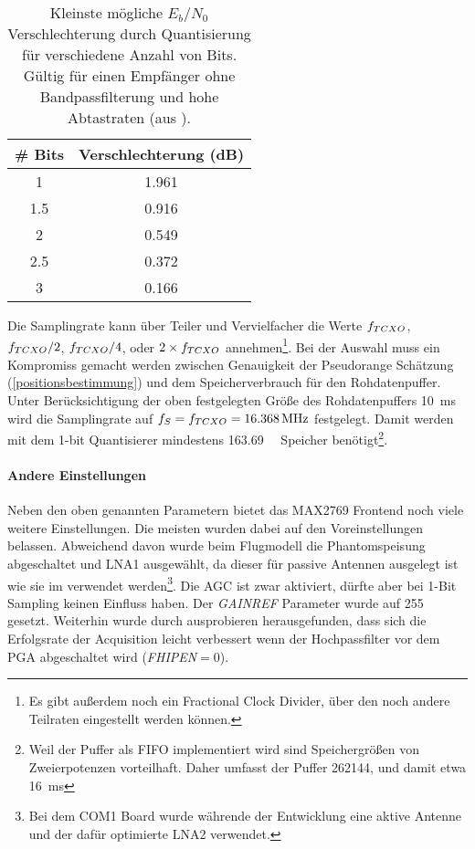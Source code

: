 \begin{table}[htbp]
    \ttabbox
    {
        \caption[$E_b/N_0$ Verschlechterung durch Quantisierung]{Kleinste mögliche $E_b/N_0$ Verschlechterung durch Quantisierung für verschiedene Anzahl von Bits. Gültig für einen Empfänger ohne Bandpassfilterung und hohe Abtastraten (aus \cite{hegarty2011analytical}).}
        \label{TabDegradQuant}
    }
    {
    \begin{tabular}{c c}
        \toprule
        \# Bits             &  Verschlechterung (dB)\\
        \midrule
        \num{1}         & \num{1,961} \\
        \num{1.5}    & \num{0.916} \\
        \num{2}           & \num{0.549} \\
        \num{2.5}    & \num{0.372} \\
        \num{3}           & \num{0.166} \\
        \bottomrule
    \end{tabular}
    }
\end{table}

Die Samplingrate kann über Teiler und Vervielfacher die Werte $f_{TCXO}$, $f_{TCXO}/2$, $f_{TCXO}/4$, oder $2\times f_{TCXO}$ annehmen\footnote{Es gibt außerdem noch ein Fractional Clock Divider, über den noch andere Teilraten eingestellt werden können.}. Bei der Auswahl muss ein Kompromiss gemacht werden zwischen Genauigkeit der Pseudorange Schätzung (\ref{positionsbestimmung}) und dem Speicherverbrauch für den Rohdatenpuffer. Unter Berücksichtigung der oben festgelegten Größe des Rohdatenpuffers \SI{10}{\ms} wird die Samplingrate auf  $f_S=\gpsftcxo=\SI{16.368}{\MHz}$ festgelegt. Damit werden mit dem 1-bit Quantisierer mindestens \SI{163.69}{\kilo\bit} Speicher benötigt\footnote{Weil der Puffer als FIFO implementiert wird sind Speichergrößen von Zweierpotenzen vorteilhaft. Daher umfasst der Puffer \SI{262144}{\bit}, und damit etwa \SI{16}{\ms}}.

\paragraph{Andere Einstellungen} Neben den oben genannten Parametern bietet das MAX2769 Frontend noch viele weitere Einstellungen. Die meisten wurden dabei auf den Voreinstellungen belassen. Abweichend davon wurde beim Flugmodell die Phantomspeisung abgeschaltet und LNA1 ausgewählt, da dieser für passive Antennen ausgelegt ist wie sie im \dscubesat verwendet werden\footnote{Bei dem COM1 Board wurde währende der Entwicklung eine aktive Antenne und der dafür optimierte LNA2 verwendet.}. Die \gls{AGC} ist zwar aktiviert, dürfte aber bei 1-Bit Sampling keinen Einfluss haben. Der \emph{GAINREF} Parameter wurde auf 255 gesetzt. Weiterhin wurde durch ausprobieren herausgefunden, dass sich die Erfolgsrate der Acquisition leicht verbessert wenn der Hochpassfilter vor dem \gls{PGA} abgeschaltet wird (\emph{FHIPEN}$=0$).


